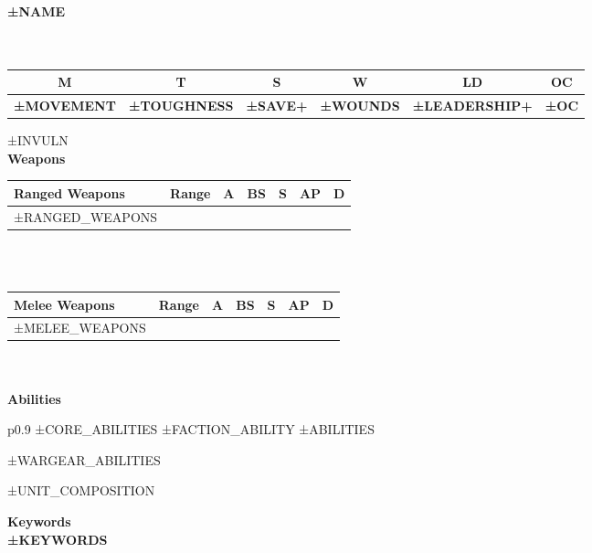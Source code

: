 {\huge \bfseries ±NAME}\\
\thispagestyle{empty} 
\\ \\
\noindent
\begin{tabular}{| c | c | c | c | c | c |}
\hline
\Large\textbf{M} & \Large\textbf{T} & \Large\textbf{S} & \Large\textbf{W} & \Large\textbf{LD} & \Large\textbf{OC} \\
\hline
\large\textbf{±MOVEMENT} & \large\textbf{±TOUGHNESS} & \large\textbf{±SAVE+} & \large\textbf{±WOUNDS} & \large\textbf{±LEADERSHIP+} & \large\textbf{±OC} \\
\hline
\end{tabular}
±INVULN
\\
\noindent\makebox[\linewidth]{\rule{\paperwidth}{0.4pt}}
{\bfseries \Large Weapons}\\

\noindent
\begin{tabular}{| l | c | c | c | c | c | c |}
\hline
\large\textbf{Ranged Weapons} & \large\textbf{Range} & \large\textbf{A} & \large\textbf{BS} & \large\textbf{S} & \large\textbf{AP} & \large\textbf{D} \\
\hline
±RANGED_WEAPONS
\hline
\end{tabular}
\\ \\ 

\noindent
\begin{tabular}{| l | c | c | c | c | c | c |}
\hline
\large\textbf{Melee Weapons} & \large\textbf{Range} & \large\textbf{A} & \large\textbf{BS} & \large\textbf{S} & \large\textbf{AP} & \large\textbf{D} \\
\hline
±MELEE_WEAPONS
\hline
\end{tabular}
\\ \\

\noindent\makebox[\linewidth]{\rule{\paperwidth}{0.4pt}}
{\bfseries \Large Abilities}\\


\noindent
\noindent\begin{tblr}{p{0.9\linewidth}}
±CORE_ABILITIES
±FACTION_ABILITY
±ABILITIES
\end{tblr}


±WARGEAR_ABILITIES


±UNIT_COMPOSITION

\noindent\makebox[\linewidth]{\rule{\paperwidth}{0.4pt}}
{\bfseries \Large Keywords}\\

\textbf{\uppercase{±KEYWORDS}}